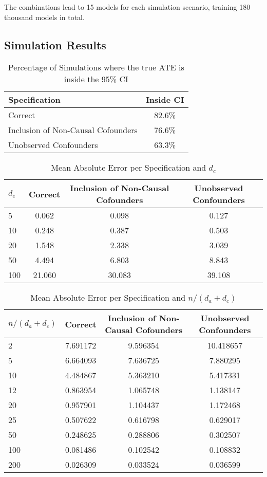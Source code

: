 \documentclass{article}
\numberwithin{equation}{section}
\begin{document}
The combinations lead to 15 models for each simulation scenario, training 180 thousand models in total.

\subsection{Simulation Results}


\begin{table}[H]
    \centering
    \begin{tabular}{lc}
        \toprule
        Specification & Inside CI \\
        \midrule
        Correct & 82.6\% \\
        Inclusion of Non-Causal Cofounders & 76.6\% \\
        Unobserved Confounders & 63.3\% \\
        \bottomrule
    \end{tabular}
    \caption{Percentage of Simulations where the true ATE is inside the 95\% CI}
\end{table}

\begin{table}[H]
    \centering
    \begin{tabular}{lccc}
        \toprule
        $d_c$ & Correct & Inclusion of Non-Causal Cofounders & Unobserved Confounders \\
        \midrule
        5 & 0.062 & 0.098 & 0.127 \\
        10 & 0.248 & 0.387 & 0.503 \\
        20 & 1.548 & 2.338 & 3.039 \\
        50 & 4.494 & 6.803 & 8.843 \\
        100 & 21.060 & 30.083 & 39.108 \\
        \bottomrule
    \end{tabular}
    \caption{Mean Absolute Error per Specification and $d_c$}
\end{table}

\begin{table}[H]
    \centering
    \begin{tabular}{lccc}
        \toprule
        $n / (d_a + d_c)$ & Correct & Inclusion of Non-Causal Cofounders & Unobserved Confounders \\
        \midrule
        2 & 7.691172 & 9.596354 & 10.418657 \\
        5 & 6.664093 & 7.636725 & 7.880295 \\
        10 & 4.484867 & 5.363210 & 5.417331 \\
        12 & 0.863954 & 1.065748 & 1.138147 \\
        20 & 0.957901 & 1.104437 & 1.172468 \\
        25 & 0.507622 & 0.616798 & 0.629017 \\
        50 & 0.248625 & 0.288806 & 0.302507 \\
        100 & 0.081486 & 0.102542 & 0.108832 \\
        200 & 0.026309 & 0.033524 & 0.036599 \\
        \bottomrule
    \end{tabular}
    \caption{Mean Absolute Error per Specification and $n / (d_a + d_c)$}
\end{table}
\end{document}
